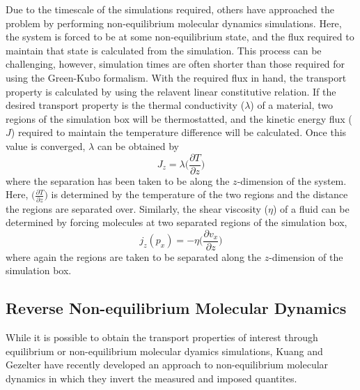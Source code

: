 Due to the timescale of the simulations required, others have
approached the problem by performing non-equilibrium molecular
dynamics simulations. Here, the system is forced to be at some
non-equilibrium state, and the flux required to maintain that state is
calculated from the simulation. This process can be challenging,
however, simulation times are often shorter than those required for
using the Green-Kubo formalism. With the required flux in hand, the
transport property is calculated by using the relavent linear
constitutive relation. If the desired transport property is the
thermal conductivity ($\lambda$) of a material, two regions of the simulation box
will be thermostatted, and the kinetic energy flux ($J$) required to
maintain the temperature difference will be calculated. Once this
value is converged, $\lambda$ can be obtained by 
\begin{equation}\label{thermalTransport}
J_{z} = \lambda \big(\frac{\partial T}{\partial z}\big)
\end{equation}
where the separation has been taken to be along the $z$-dimension of
the system.  Here, $\big(\frac{\partial T}{\partial z}\big) $ is
determined by the temperature of the two regions and the distance the
regions are separated over. Similarly, the shear viscosity
($\eta$) of a fluid can be determined by forcing molecules at two
separated regions of the simulation box,
\begin{equation}\label{momentumTransport}
  j_{z}(p_{x}) = -\eta \big(\frac{\partial v_{x}}{\partial z}\big)
\end{equation}
where again the regions are taken to be separated along the
$z$-dimension of the simulation box.

\subsection{Reverse Non-equilibrium Molecular Dynamics}
While it is possible to obtain the transport properties of interest
through equilibrium or non-equilibrium molecular dyamics simulations,
Kuang and Gezelter have recently developed an approach to
non-equilibrium molecular dynamics in which they invert the measured
and imposed quantites. 


